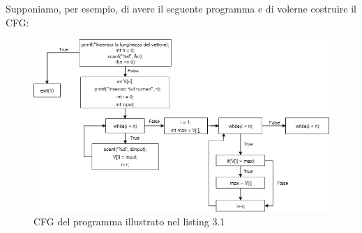 \documentclass[../main.tex]{subfiles}
\begin{document}
\newpage \noindent
Supponiamo, per esempio, di avere il seguente programma e di volerne costruire il CFG:

\begin{figure}[H]
    \centering
    \includegraphics[width = 1\linewidth]{../images/CFG.drawio.png}
    \centering
    \caption{CFG del programma illustrato nel listing 3.1}
\end{figure}
\end{document}
